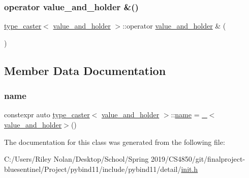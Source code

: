 \mbox{\label{classtype__caster_3_01value__and__holder_01_4_ab6c68773e5a599518b14f0fe8eee0f08}} 
\subsubsection{\texorpdfstring{operator value\_and\_holder \&()}{operator value\_and\_holder \&()}}
{\footnotesize\ttfamily \mbox{\hyperlink{classtype__caster}{type\+\_\+caster}}$<$ \mbox{\hyperlink{structvalue__and__holder}{value\+\_\+and\+\_\+holder}} $>$\+::operator \mbox{\hyperlink{structvalue__and__holder}{value\+\_\+and\+\_\+holder}} \& (\begin{DoxyParamCaption}{ }\end{DoxyParamCaption})\hspace{0.3cm}{\ttfamily [inline]}}



\subsection{Member Data Documentation}
\mbox{\label{classtype__caster_3_01value__and__holder_01_4_ab64ece6aa46f12ba98a582098f12b7b7}} 
\subsubsection{\texorpdfstring{name}{name}}
{\footnotesize\ttfamily constexpr auto \mbox{\hyperlink{classtype__caster}{type\+\_\+caster}}$<$ \mbox{\hyperlink{structvalue__and__holder}{value\+\_\+and\+\_\+holder}} $>$\+::\mbox{\hyperlink{structname}{name}} = \mbox{\hyperlink{descr_8h_af114703e20c6527e87163eb2798f74b8}{\+\_\+}}$<$\mbox{\hyperlink{structvalue__and__holder}{value\+\_\+and\+\_\+holder}}$>$()\hspace{0.3cm}{\ttfamily [static]}}



The documentation for this class was generated from the following file\+:\begin{DoxyCompactItemize}
\item 
C\+:/\+Users/\+Riley Nolan/\+Desktop/\+School/\+Spring 2019/\+C\+S4850/git/finalproject-\/bluesentinel/\+Project/pybind11/include/pybind11/detail/\mbox{\hyperlink{init_8h}{init.\+h}}\end{DoxyCompactItemize}
